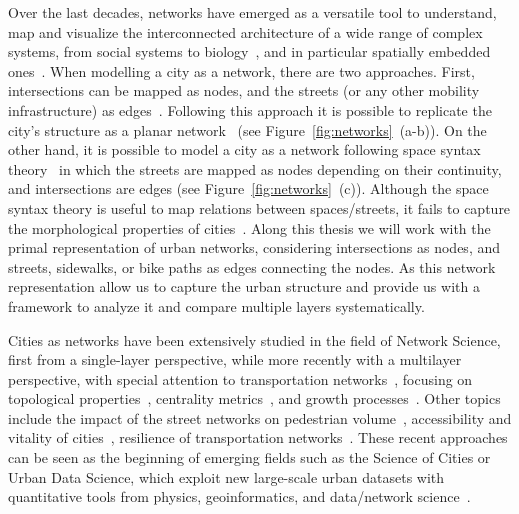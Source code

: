 Over the last decades, networks have emerged as a versatile tool to understand, map and visualize the interconnected architecture of a wide range of complex systems, from social systems to biology~\cite{albert2002statistical, dorogovtsev2002evolution, newman2003structure, boccaletti2006complex}, and in particular spatially embedded ones~\cite{barthelemy2011spatial}. When modelling a city as a network, there are two approaches. First, intersections can be mapped as nodes, and the streets (or any other mobility infrastructure) as edges~\cite{porta2006primal}. Following this approach it is possible to replicate the city's structure as a planar network~\cite{Boeing2020Planarity} (see Figure~\ref{fig:networks}~(a-b)). On the other hand, it is possible to model a city as a network following space syntax theory~\cite{hillier1976syntax} in which the streets are mapped as nodes depending on their continuity, and intersections are edges (see Figure~\ref{fig:networks}~(c)). Although the space syntax theory is useful to map relations between spaces/streets, it fails to capture the morphological properties of cities~\cite{batty2004new}. Along this thesis we will work with the primal representation of urban networks, considering intersections as nodes, and streets, sidewalks, or bike paths as edges connecting the nodes. As this network representation allow us to capture the urban structure and provide us with a framework to analyze it and compare multiple layers systematically.

Cities as networks have been extensively studied in the field of Network Science, first from a single-layer perspective, while more recently with a multilayer perspective, with special attention to transportation networks~\cite{lin2013complex,barthelemy2011spatial,ding2019application}, focusing on topological properties~\cite{jiang2004topological,cardillo2006structural,barthelemy2008patterns,batty2008size,barthelemy2011spatial,strano2013comparative,louf2014typology,boeing2020multiscale}, centrality metrics~\cite{crucitti2008centrality,Boeing2020Planarity,kirkley2018structural}, and growth processes~\cite{makse1995growth,strano2012evolution}. Other topics include the impact of the street networks on pedestrian volume~\cite{hajrasouliha2015connectivity}, accessibility and vitality of cities~\cite{denadai2016death,biazzo2019accesibility}, resilience of transportation networks~\cite{baggag2018resilience,ferretti2019resilience}. These recent approaches can be seen as the beginning of emerging fields such as the Science of Cities or Urban Data Science, which exploit new large-scale urban datasets with quantitative tools from physics, geoinformatics, and data/network science~\cite{batty2013new,resch2019hds}. 

